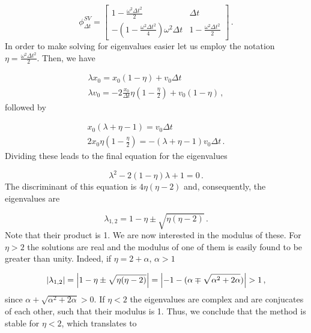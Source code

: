 \documentclass[12pt, class=report, crop=false]{standalone}
\begin{document}
\begin{equation}
  \phi_{\Delta t}^{SV} =
  \begin{bmatrix}
    1 - \frac{\omega^2 \Delta t^2}{2} & \Delta t\\
    - \left(1 - \frac{\omega^2 \Delta t^2}{4}\right) \omega^2 \Delta t & 1 - \frac{\omega^2 \Delta t^2}{2}
  \end{bmatrix}\,.
\end{equation}
In order to make solving for eigenvalues easier let us employ the notation \(\eta = \frac{\omega^2 \Delta t^2}{2}\). Then, we have

\begin{subequations}
  \begin{align}
    \lambda x_0 = x_0 (1-\eta) + v_0 \Delta t\\
    \lambda v_0 = - 2 \frac{x_0}{\Delta t} \eta \left(1-\frac{\eta}{2}\right) + v_0 (1-\eta)\,,
  \end{align}
\end{subequations}
followed by

\begin{subequations}
  \begin{align}
    x_0 (\lambda + \eta -1) = v_0 \Delta t\\
    2 x_0 \eta \left(1-\frac{\eta}{2}\right) = - (\lambda + \eta -1)v_0 \Delta t\,.
  \end{align}
\end{subequations}
Dividing these leads to the final equation for the eigenvalues

\begin{equation}
  \lambda^2 - 2(1-\eta) \lambda +1 = 0\,.
\end{equation}
The discriminant of this equation is \(4\eta(\eta-2)\) and, consequently, the eigenvalues are

\begin{equation}
  \lambda_{1,2} = 1 - \eta \pm \sqrt{\eta(\eta - 2)}\,.
\end{equation}
Note that their product is 1. We are now interested in the modulus of these. For \(\eta> 2\) the solutions are real and the modulus of one of them is easily found to be greater than unity. Indeed, if \(\eta = 2+\alpha\), \(\alpha>1\)

\begin{equation}
  \abs{\lambda_{1,2}} = \abs{1-\eta \pm \sqrt{\eta(\eta-2)}} = \abs{-1 - (\alpha \mp \sqrt{\alpha^2 + 2\alpha})} >1\,,
\end{equation}
since \(\alpha + \sqrt{\alpha^2 + 2\alpha} > 0\). If \(\eta< 2\) the eigenvalues are complex and are conjucates of each other, such that their modulus is 1. Thus, we conclude that the method is stable for \(\eta< 2\), which translates to
\end{document}
